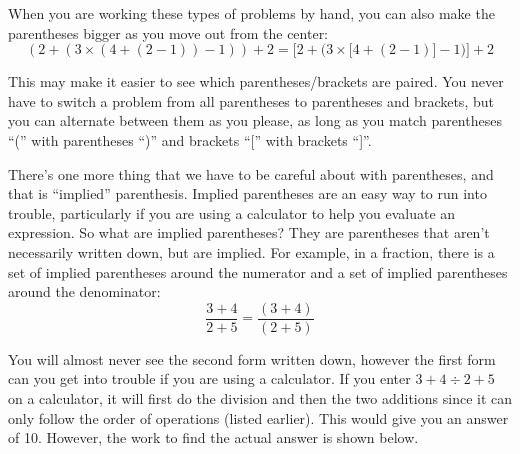 When you are working these types of problems by hand, you can also make the parentheses bigger as you move out from the center:
\begin{equation*}\label{eqn:sizes_of_parentheses}
	(2+(3\times(4+(2-1)) -1)) +2  = \bigg[2+\Big(3\times \big[4+(2-1)\big] -1\Big)\bigg] +2
\end{equation*}

This may make it easier to see which parentheses/brackets are paired. You never have to switch a problem from all parentheses to parentheses and brackets, but you can alternate between them as you please, as long as you match parentheses ``('' with parentheses ``)'' and brackets ``['' with brackets ``]''.

There's one more thing that we have to be careful about with parentheses, and that is ``implied'' parenthesis. Implied parentheses are an easy way to run into trouble, particularly if you are using a calculator to help you evaluate an expression. So what are implied parentheses? They are parentheses that aren't necessarily written down, but are implied. For example, in a fraction, there is a set of implied parentheses around the numerator and a set of implied parentheses around the denominator:\\[-8pt]
\begin{equation}\label{eqn:implied_parentheses_fraction}
	\frac{3+4}{2+5} = \frac{(3+4)}{(2+5)}
\end{equation}

You will almost never see the second form written down, however the first form can you get into trouble if you are using a calculator. If you enter $3+4\div 2+5$ on a calculator, it will first do the division and then the two additions since it can only follow the order of operations (listed earlier). This would give you an answer of 10. However, the work to find the actual answer is shown below.

